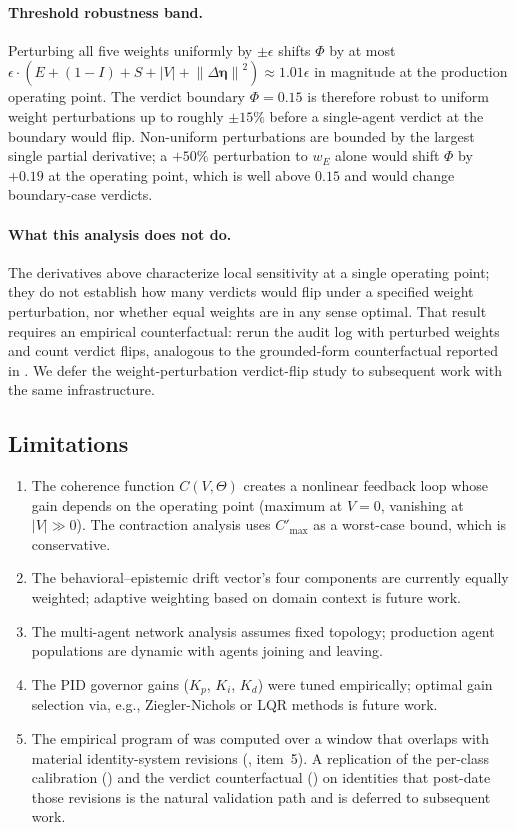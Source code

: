 \documentclass[11pt,twocolumn]{article}
\newcommand{\norm}[1]{\left\lVert #1 \right\rVert}
\newcommand{\abs}[1]{\left| #1 \right|}
\newcommand{\deta}{\ensuremath{\Delta\bm{\eta}}}
\newcommand{\cv}{\ensuremath{C(V,\Theta)}}
\begin{document}
\paragraph{Threshold robustness band.}
Perturbing all five weights uniformly by $\pm \epsilon$ shifts
$\Phi$ by at most
$\epsilon \cdot (E + (1-I) + S + \abs{V} + \norm{\deta}^2)
\approx 1.01\epsilon$ in magnitude at the production operating
point. The verdict boundary $\Phi = 0.15$ is therefore robust to
uniform weight perturbations up to roughly $\pm 15\%$ before a
single-agent verdict at the boundary would flip. Non-uniform
perturbations are bounded by the largest single partial
derivative; a $+50\%$ perturbation to $w_E$ alone would shift
$\Phi$ by $+0.19$ at the operating point, which is well above
$0.15$ and would change boundary-case verdicts.

\paragraph{What this analysis does not do.}
The derivatives above characterize local sensitivity at a single
operating point; they do not establish how many verdicts would
flip under a specified weight perturbation, nor whether equal
weights are in any sense optimal. That result requires an
empirical counterfactual: rerun the audit log with perturbed
weights and count verdict flips, analogous to the grounded-form
counterfactual reported in . We defer the
weight-perturbation verdict-flip study to subsequent work with
the same infrastructure.

\subsection{Limitations}

\begin{enumerate}
\item The coherence function $\cv$ creates a nonlinear feedback
  loop whose gain depends on the operating point (maximum at
  $V = 0$, vanishing at $|V| \gg 0$). The contraction analysis
  uses $C'_{\max}$ as a worst-case bound, which is conservative.
\item The behavioral--epistemic drift vector's four components are currently
  equally weighted; adaptive weighting based on domain context
  is future work.
\item The multi-agent network analysis assumes fixed topology;
  production agent populations are dynamic with agents joining
  and leaving.
\item The PID governor gains ($K_p$, $K_i$, $K_d$) were tuned
  empirically; optimal gain selection via, e.g., Ziegler-Nichols
  or LQR methods is future work.
\item The empirical program of  was computed
  over a window that overlaps with material identity-system revisions
  (, item~5). A replication of the per-class
  calibration () and the verdict
  counterfactual () on identities
  that post-date those revisions is the natural validation path and
  is deferred to subsequent work.
\end{enumerate}
\end{document}
